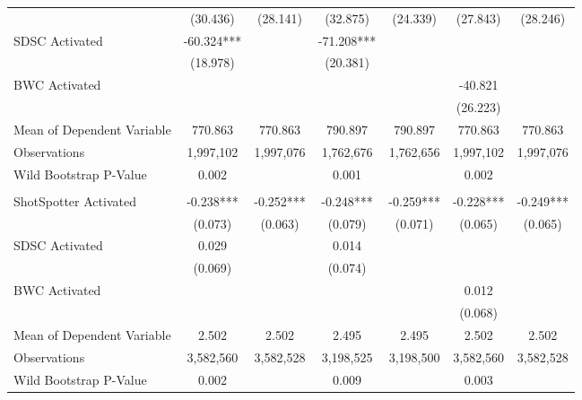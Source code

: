 \begin{table}[H]
\begin{threeparttable}
\begin{tabular}[t]{lcccccc}
\hspace{1em} & (30.436) & (28.141) & (32.875) & (24.339) & (27.843) & (28.246)\\
\hspace{1em}SDSC Activated & -60.324*** &  & -71.208*** &  &  & \\
\hspace{1em} & (18.978) &  & (20.381) &  &  & \\
\hspace{1em}BWC Activated &  &  &  &  & -40.821 & \\
\hspace{1em} &  &  &  &  & (26.223) & \\
\hspace{1em}Mean of Dependent Variable & 770.863 & 770.863 & 790.897 & 790.897 & 770.863 & 770.863\\
\hspace{1em}Observations & 1,997,102 & 1,997,076 & 1,762,676 & 1,762,656 & 1,997,102 & 1,997,076\\
\hspace{1em}Wild Bootstrap P-Value & 0.002 &  & 0.001 &  & 0.002 & \\
\addlinespace[0.5cm]
\multicolumn{7}{l}{\textit{Panel C: Arrest Made}}\\
\hspace{1em}ShotSpotter Activated & -0.238*** & -0.252*** & -0.248*** & -0.259*** & -0.228*** & -0.249***\\
\hspace{1em} & (0.073) & (0.063) & (0.079) & (0.071) & (0.065) & (0.065)\\
\hspace{1em}SDSC Activated & 0.029 &  & 0.014 &  &  & \\
\hspace{1em} & (0.069) &  & (0.074) &  &  & \\
\hspace{1em}BWC Activated &  &  &  &  & 0.012 & \\
\hspace{1em} &  &  &  &  & (0.068) & \\
\hspace{1em}Mean of Dependent Variable & 2.502 & 2.502 & 2.495 & 2.495 & 2.502 & 2.502\\
\hspace{1em}Observations & 3,582,560 & 3,582,528 & 3,198,525 & 3,198,500 & 3,582,560 & 3,582,528\\
\hspace{1em}Wild Bootstrap P-Value & 0.002 &  & 0.009 &  & 0.003 & \\

\end{tabular}
\end{threeparttable}
\end{table}
